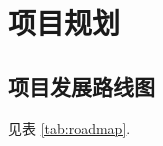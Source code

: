 \documentclass[a4paper]{article}
\begin{document}







\newpage
\section{项目规划}

\subsection{项目发展路线图}
见表 \ref{tab:roadmap}.
\end{document}
